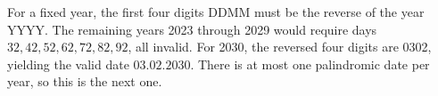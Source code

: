 For a fixed year, the first four digits DDMM must be the reverse of the year YYYY. The remaining years 2023 through 2029 would require days $32,42,52,62,72,82,92$, all invalid. For 2030, the reversed four digits are 0302, yielding the valid date $\boxed{03.02.2030}$. There is at most one palindromic date per year, so this is the next one.
